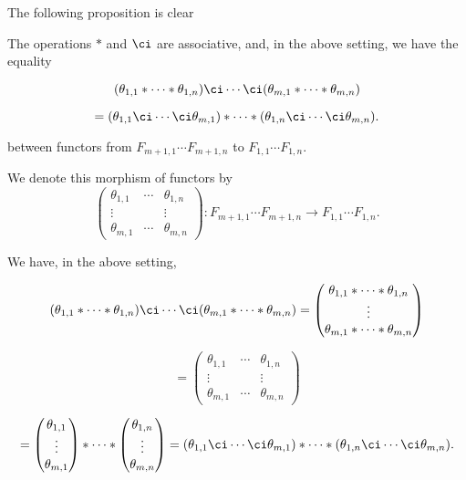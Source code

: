 \documentclass[12pt]{article}
\theoremstyle{remark}
\theoremstyle{definition}
\begin{document}
The following proposition is clear 

\begin{prop}
The operations $*$ and $\ci$ are associative, and, in the above setting, we have the equality 

$$
(\theta_{1,1}*\cdots*\theta_{1,n})\ci\cdots\ci(\theta_{m,1}*\cdots*\theta_{m,n})
$$ 

$$
=(\theta_{1,1}\ci\cdots\ci\theta_{m,1})*\cdots*(\theta_{1,n}\ci\cdots\ci\theta_{m,n}).
$$

\nn between functors from $F_{m+1,1}\cdots F_{m+1,n}$ to $F_{1,1}\cdots F_{1,n}$.
\end{prop}

\begin{nota} 
We denote this morphism of functors by
$$
\begin{pmatrix}
\theta_{1,1}&\cdots&\theta_{1,n}\\
\vdots&&\vdots\\ 
\theta_{m,1}&\cdots&\theta_{m,n}
\end{pmatrix}:F_{m+1,1}\cdots F_{m+1,n}\to F_{1,1}\cdots F_{1,n}.
$$ 
\end{nota}

\begin{prop}
We have, in the above setting,

$$
(\theta_{1,1}*\cdots*\theta_{1,n})\ci\cdots\ci(\theta_{m,1}*\cdots*\theta_{m,n})
=\begin{pmatrix}
\theta_{1,1}*\cdots*\theta_{1,n}\\
\vdots\\ 
\theta_{m,1}*\cdots*\theta_{m,n}
\end{pmatrix}
$$ 

$$
=\begin{pmatrix}
\theta_{1,1}&\cdots&\theta_{1,n}\\
\vdots&&\vdots\\ 
\theta_{m,1}&\cdots&\theta_{m,n}
\end{pmatrix}
$$

$$
=\begin{pmatrix}\theta_{1,1}\\ \vdots\\ \theta_{m,1}\end{pmatrix}*\cdots*
\begin{pmatrix}\theta_{1,n}\\ \vdots\\ \theta_{m,n}\end{pmatrix}
=(\theta_{1,1}\ci\cdots\ci\theta_{m,1})*\cdots*(\theta_{1,n}\ci\cdots\ci\theta_{m,n}).
$$
\end{prop}
\end{document}
